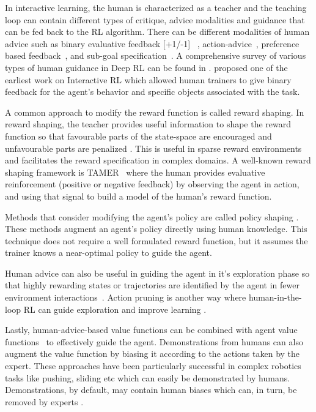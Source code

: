 \documentclass[twoside,11pt]{article}
\begin{document}
\begin{enumerate}
In interactive learning, the human is characterized as a teacher and the teaching loop can contain different types of critique, advice modalities and guidance that can be fed back to the RL algorithm. There can be different modalities of human advice such as binary evaluative feedback [+1/-1] ~\citep{Knox:2008:TAMER}, action-advice~\citep{torrey2013teaching}, preference based feedback~\citep{Christiano:2017:DeepRLHumanPreferences,LeeSmithAbbeel:2021:FeedbackPreferenceHITLLearningPEBBLE}, and sub-goal specification~\citep{le2018hierarchical}. A comprehensive survey of various types of human guidance in Deep RL can be found in \citet{zhang2019leveraging}. \citet{Thomaz:2006:RLWithHumanTeachers} proposed one of the earliest work on Interactive RL which allowed human trainers to give binary feedback for the agent's behavior and specific objects associated with the task.

A common approach to modify the reward function is called reward shaping. In reward shaping, the teacher provides useful information to shape the reward function so that favourable parts of the state-space are encouraged and unfavourable parts are penalized \citep{ng:99}. This is useful in sparse reward environments and facilitates the reward specification in complex domains. A well-known reward shaping framework is TAMER~\citep{Knox:2008:TAMER, knox:13} where the human provides evaluative reinforcement (positive or negative feedback) by observing the agent in action, and using that signal to build a model of the human's reward function. 

Methods that consider modifying the agent's policy are called policy shaping \citep{cederborg2015policy,griffith2013policy,WuEtAl:2021:HITLDRLAutonomousDriving}. These methods augment an agent's policy directly using human knowledge. This technique does not require a well formulated reward function, but it assumes the trainer knows a near-optimal policy to guide the agent. 

Human advice can also be useful in guiding the agent in it’s exploration phase so that highly rewarding states or trajectories are identified by the agent in fewer environment interactions~\citep{amir2016interactive}. Action pruning is another way where human-in-the-loop RL can guide exploration and improve learning \citep{Abel:2017:AgentAgnosticHumanInTheLoopRL}.

Lastly, human-advice-based value functions can be combined with agent value functions~\citep{jiang:21,kartoun:10, taylor2011integrating, WuEtAl:2021:HITLDRLAutonomousDriving} to effectively guide the agent. Demonstrations \citep{hester2018deep,vecerik2017leveraging,nair2018overcoming} from humans can also augment the value function by biasing it according to the  actions taken by the expert. These approaches have been particularly successful in complex robotics tasks like pushing, sliding etc which can easily be demonstrated by humans.  Demonstrations, by default, may contain human biases which can, in turn, be removed by experts \citep{Wang:2022:SkillPreferences}.


\end{enumerate}
\end{document}
